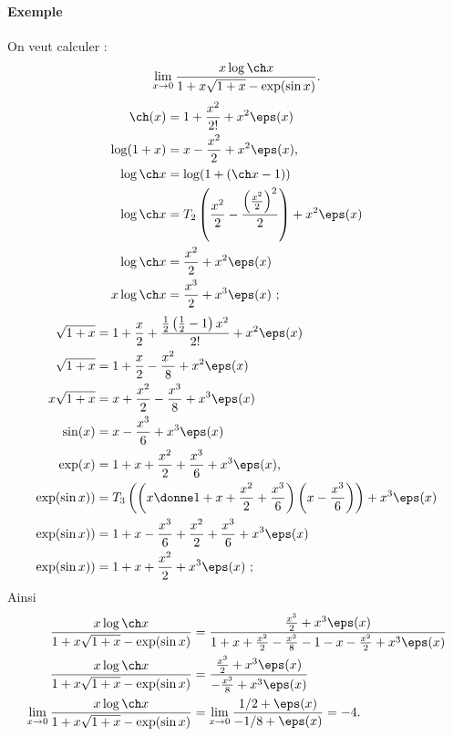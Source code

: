 \paragraph{Exemple}On veut calculer : \[ \lim_{x\to 0} \frac{x\log\ch x}{1+x\sqrt{1+x} - \exp(\sin x)}.\]
\begin{align*}
\ch(x) &= 1 +\frac{x^{2}}{2!} + x^{2}\eps(x) \\
\log(1+x) &= x - \frac{x^{2}}{2} +x^{2}\eps(x), \\
\log \ch x &= \log(1+(\ch x - 1)) \\
\log \ch x &= T_2\left( \frac{x^{2}}{2}  - \frac{\left(\frac{x^{2}}{2} \right)^{2}}{2}\right) + x^{2}\eps(x) \\
\log \ch x &= \frac{x^{2}}{2} + x^{2}\eps(x) \\
x\log\ch x &= \frac{x^{3}}{2} + x^{3}\eps(x) \ ;
\end{align*}
\begin{align*}
\sqrt{1+x} &= 1 + \frac{x}{2} + \frac{\frac{1}{2}\left(\frac{1}{2}-1\right)x^{2}}{2!} + x^{2}\eps(x) \\
\sqrt{1+x} &= 1 + \frac{x}{2} - \frac{x^{2}}{8} + x^{2}\eps(x)\\
x\sqrt{1+x} &= x + \frac{x^{2}}{2} - \frac{x^{3}}{8} + x^{3}\eps(x) \\
\sin(x) &= x - \frac{x^{3}}{6} + x^{3}\eps(x) \\
\exp(x) &= 1 + x + \frac{x^{2}}{2} + \frac{x^{3}}{6} +x^{3}\eps(x), \\
\exp(\sin x)) &= T_3\left( \left(x\donne 1 + x + \frac{x^{2}}{2} + \frac{x^{3}}{6} \right) \left( x - \frac{x^{3}}{6}\right)\right) + x^{3}\eps(x) \\
\exp(\sin x)) &= 1 + x - \frac{x^{3}}{6} + \frac{x^{2}}{2} + \frac{x^{3}}{6} + x^{3}\eps(x) \\
\exp(\sin x)) &= 1 + x + \frac{x^{2}}{2} + x^{3}\eps(x) \ ;
\end{align*}
Ainsi 
\begin{align*}
\frac{x\log\ch x}{1+x\sqrt{1+x} - \exp(\sin x)} &= \frac{ \frac{x^{3}}{2} + x^{3}\eps(x)}{1 +x + \frac{x^{2}}{2} - \frac{x^{3}}{8}  -1 - x - \frac{x^{2}}{2} + x^{3}\eps(x)}\\
\frac{x\log\ch x}{1+x\sqrt{1+x} - \exp(\sin x)} &= \frac{\frac{x^{3}}{2} + x^{3}\eps(x)}{-\frac{x^{3}}{8} + x^{3}\eps(x)} \\
\lim_{x\to 0}\frac{x\log\ch x}{1+x\sqrt{1+x} - \exp(\sin x)} &=\lim_{x\to 0} \frac{1/2 + \eps(x)}{-1/8 + \eps(x)} = -4.
\end{align*}

